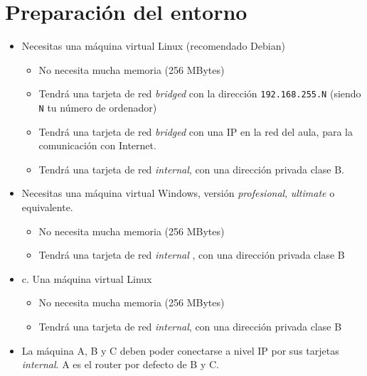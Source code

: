 \section{Preparación del entorno}
\begin{itemize}
\item  Necesitas una máquina virtual Linux (recomendado Debian)
  \begin{itemize}
  \item No necesita mucha memoria (256 MBytes)
    
  \item Tendrá una tarjeta de red \textit{bridged} con la dirección \texttt{192.168.255.N} (siendo \texttt{N} tu número de ordenador)
  \item Tendrá una tarjeta de red \textit{bridged} con una IP en la red del aula, para la comunicación con Internet.
  \item Tendrá una tarjeta de red \textit{internal}, con una dirección privada clase B.

  \end{itemize}



\item Necesitas una máquina virtual Windows, versión \textit{profesional}, \textit{ultimate} o equivalente.
  \begin{itemize}
  \item  No necesita mucha memoria (256 MBytes)
  \item Tendrá una tarjeta de red \textit{internal} , con una dirección privada clase B
  \end{itemize}
\item c. Una máquina virtual Linux
  \begin{itemize}
  \item No necesita mucha memoria (256 MBytes)
  \item Tendrá una tarjeta de red \textit{internal}, con una dirección privada clase B
  \end{itemize}
  
\item  La máquina A, B y C deben poder conectarse a nivel IP por sus tarjetas \textit{internal}. A es el router por defecto de B y C.
\end{itemize}



